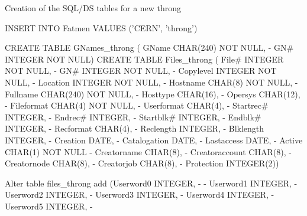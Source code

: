 \begin{Fighere}
\caption{Creation of the SQL/DS tables for a new throng}
\label{FSQLTAB}
\begin{minipage}[t]{.498\linewidth}
\begin{XMP}
INSERT INTO Fatmen VALUES ('CERN', 'throng')
 
CREATE TABLE GNames_throng ( GName CHAR(240) NOT NULL,   -
                             GN# INTEGER NOT NULL)
CREATE TABLE Files_throng ( File# INTEGER NOT NULL,      -
                            GN# INTEGER NOT NULL,        -
                            Copylevel INTEGER NOT NULL,  -
                            Location INTEGER NOT NULL,   -
                            Hostname CHAR(8) NOT NULL,   -
                            Fullname CHAR(240) NOT NULL, -
                            Hosttype CHAR(16),           -
                            Opersys CHAR(12),            -
                            Fileformat CHAR(4) NOT NULL, -
                            Userformat CHAR(4),          -
                            Startrec# INTEGER,           -
                            Endrec# INTEGER,             -
                            Startblk# INTEGER,           -
                            Endblk# INTEGER,             -
                            Recformat CHAR(4),           -
                            Reclength INTEGER,           -
                            Blklength INTEGER,           -
                            Creation DATE,               -
                            Catalogation DATE,           -
                            Lastaccess DATE,             -
                            Active CHAR(1) NOT NULL      -
                            Creatorname CHAR(8),         -
                            Creatoraccount CHAR(8),      -
                            Creatornode CHAR(8),         -
                            Creatorjob CHAR(8),          -
                            Protection INTEGER(2))
\end{XMP}
\end{minipage}\hfill
\begin{minipage}[t]{.498\linewidth}
\begin{XMP}
Alter table files_throng add (Userword0 INTEGER,         -                                  -
                              Userword1 INTEGER,         -
                              Userword2 INTEGER,         -
                              Userword3 INTEGER,         -
                              Userword4 INTEGER,         -
                              Userword5 INTEGER,         -

\end{XMP}
\end{minipage}
\end{Fighere}

